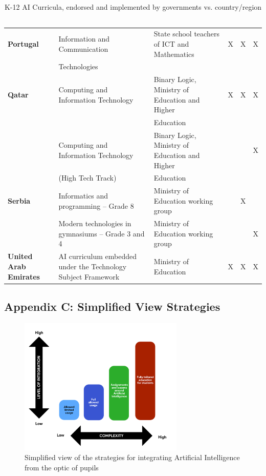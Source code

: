 \documentclass[a4paper,12pt]{report}
\begin{document}
\begin{table}[htpb]
{\begin{tabular}{llllll}
\textbf{Portugal} & Information and Communication & State school teachers of ICT and Mathematics & X & X & X \\ 
\textbf{} & Technologies & ~ & ~ & ~ & ~ \\ 
\textbf{Qatar} & Computing and Information Technology & Binary Logic, Ministry of Education and Higher & X & X & X \\ 
\textbf{} & ~ & Education & ~ & ~ & ~ \\ 
\textbf{} & Computing and Information Technology & Binary Logic, Ministry of Education and Higher & ~ & ~ & X \\ 
\textbf{} & (High Tech Track) & Education & ~ & ~ & ~ \\ 
\textbf{Serbia} & Informatics and programming – Grade 8 & Ministry of Education working group & ~ & X & ~ \\ 
\textbf{} & Modern technologies in gymnasiums – Grade 3 and 4 & Ministry of Education working group & ~ & ~ & X \\ 
\textbf{United Arab Emirates} & AI curriculum embedded under the
Technology Subject Framework & Ministry of Education & X & X & X \\\hline
\hline
\end{tabular}%
}
\caption{K-12 AI Curricula, endorsed and implemented by governments vs. country/region ~\cite{worldwide-adoption}}
\end{table}
\clearpage
\subsection{Appendix C: Simplified View Strategies}\label{app:c}
\begin{figure}[htpb]
    \centering
    \includegraphics[width=0.7\textwidth,keepaspectratio=true]{Graph 1 PWS.png}
    \caption{Simplified view of the strategies for integrating Artificial Intelligence from the optic of pupils}
\end{figure}
\end{document}
